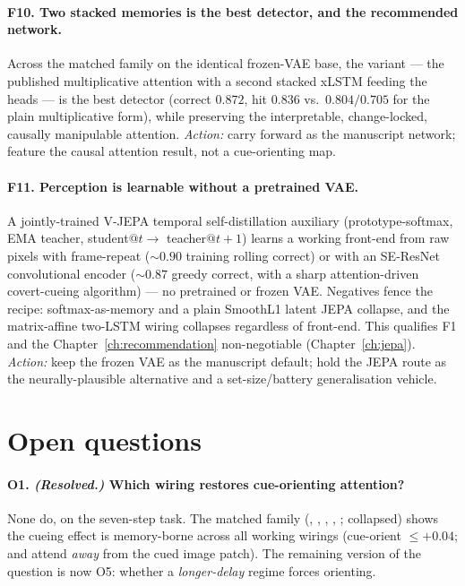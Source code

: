 \paragraph{F10. Two stacked memories is the best detector, and the recommended network.}
Across the matched family on the identical frozen-VAE base, the  variant ---
the published multiplicative attention with a second stacked xLSTM feeding the heads --- is
the best detector (correct $0.872$, hit $0.836$ vs.\ $0.804/0.705$ for the plain
multiplicative form), while preserving the interpretable, change-locked, causally
manipulable attention. \emph{Action:} carry  forward as the manuscript
network; feature the causal attention result, not a cue-orienting map.

\paragraph{F11. Perception is learnable without a pretrained VAE.} A jointly-trained V-JEPA
temporal self-distillation auxiliary (prototype-softmax, EMA teacher, student$@t\!\to$
teacher$@t{+}1$) learns a working front-end from raw pixels with frame-repeat ($\sim0.90$
training rolling correct) or with an SE-ResNet convolutional encoder ($\sim0.87$ greedy
correct, with a sharp attention-driven covert-cueing algorithm) --- no pretrained or frozen
VAE. Negatives fence the recipe: softmax-as-memory and a plain SmoothL1 latent JEPA collapse,
and the matrix-affine two-LSTM wiring collapses regardless of front-end. This qualifies F1 and
the Chapter~\ref{ch:recommendation} non-negotiable (Chapter~\ref{ch:jepa}). \emph{Action:}
keep the frozen VAE as the manuscript default; hold the JEPA route as the neurally-plausible
alternative and a set-size/battery generalisation vehicle.

\section{Open questions}

\paragraph{O1. \emph{(Resolved.)} Which wiring restores cue-orienting attention?} None do, on
the seven-step task. The matched family (, ,
, , ;  collapsed) shows the cueing
effect is memory-borne across all working wirings (cue-orient $\le+0.04$; 
and  attend \emph{away} from the cued image patch). The remaining version of
the question is now O5: whether a \emph{longer-delay} regime forces orienting.

